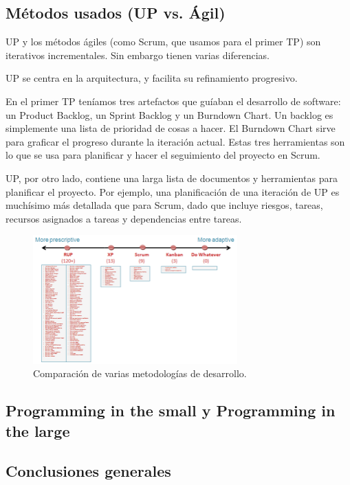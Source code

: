 \subsection{Métodos usados (UP vs. Ágil)}

UP y los métodos ágiles (como Scrum, que usamos para el primer TP) son iterativos incrementales. Sin embargo tienen varias diferencias.

UP se centra en la arquitectura, y facilita su refinamiento progresivo.

En el primer TP teníamos tres artefactos que guíaban el desarrollo de software: un Product Backlog, un Sprint Backlog y un Burndown Chart. Un backlog es simplemente una lista de prioridad de cosas a hacer. El Burndown Chart sirve para graficar el progreso durante la iteración actual. Estas tres herramientas son lo que se usa para planificar y hacer el seguimiento del proyecto en Scrum.

UP, por otro lado, contiene una larga lista de documentos y herramientas para planificar el proyecto. Por ejemplo, una planificación de una iteración de UP es muchísimo más detallada que para Scrum, dado que incluye riesgos, tareas, recursos asignados a tareas y dependencias entre tareas.


\begin{figure}[H]
  \centering
  \includegraphics[width=0.7\textwidth]{img/up-agile.png}
  \caption{\normalfont Comparación de varias metodologías de desarrollo.}
\end{figure} 

\subsection{Programming in the small y Programming in the large}

\subsection{Conclusiones generales}
